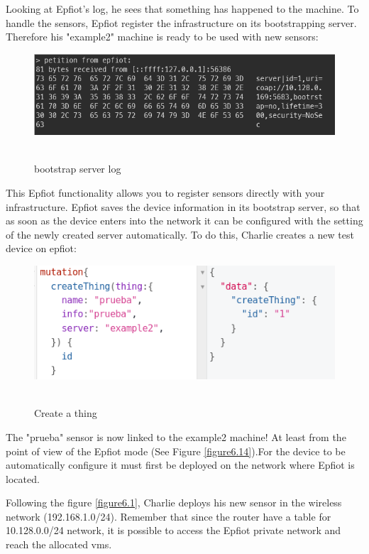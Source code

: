 \newpage
Looking at Epfiot's log, he sees that something has happened to the machine. To handle the sensors, Epfiot register the infrastructure on its bootstrapping server. Therefore his "example2" machine is ready to be used with new sensors:

\begin{figure}[h!]%
\centering
    \includegraphics[width=6.5in]{figures/bs_server_log.png}
~\caption{bootstrap server log}
\label{figure6.12}
\end{figure}

This Epfiot functionality allows you to register sensors directly with your infrastructure. Epfiot saves the device information in its bootstrap server, so that as soon as the device enters into the network it can be configured with the setting of the newly created server automatically.
To do this, Charlie creates a new test device on epfiot:

\begin{figure}[h!]%
\centering
    \includegraphics[width=5.5in]{figures/create_thing.png}
~\caption{Create a thing}
\label{figure6.13}
\end{figure}

The "prueba" sensor is now linked to the example2 machine! At least from the point of view of the Epfiot mode (See Figure \ref{figure6.14}).For the device to be automatically configure it must first be deployed on the network where Epfiot is located.

Following the figure \ref{figure6.1}, Charlie deploys his new sensor in the wireless network (192.168.1.0/24). Remember that since the router have a table for 10.128.0.0/24 network, it is possible to access the Epfiot private network and reach the allocated vms.
\newpage

